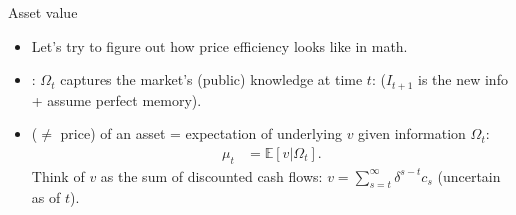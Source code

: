 \documentclass[english,10pt
,aspectratio=169
]{beamer}
\begin{document}


\begin{frame}{Asset value}
	\begin{itemize}
		\item Let's try to figure out how price efficiency looks like in math.
		\item {}: $\Omega_t$ captures the market's (public) knowledge at time $t$: 
		 ($I_{t+1}$ is the new info + assume perfect memory). 
		
		\item {} ($\neq$ price) of an asset = expectation of underlying  $v$ given information $\Omega_{t}$:
		\begin{align*}
			\mu_t &= \mathbb{E} \left[ v | \Omega_t \right].
		\end{align*}
		Think of $v$ as the sum of discounted cash flows: $v = \sum_{s=t}^{\infty} \delta^{s-t} c_s$ (uncertain as of $t$).
	\end{itemize}
\end{frame}
\end{document}
